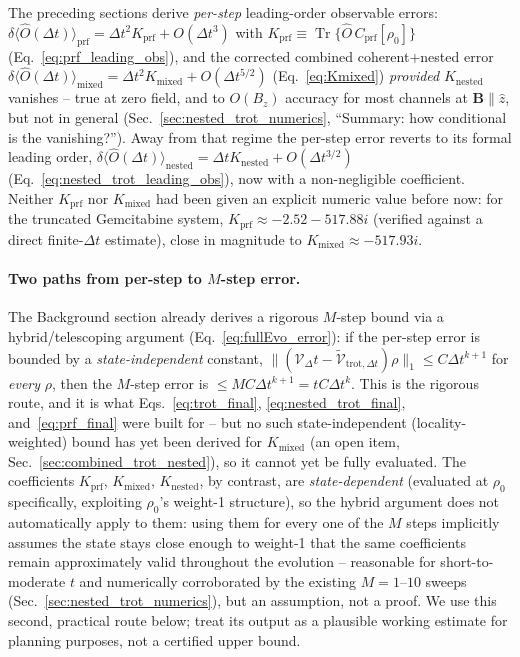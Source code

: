 \documentclass[11pt]{article}
\newcommand{\calV}{\mathcal{V}}
\newcommand{\Dt}{\Delta t}
\DeclareMathOperator{\Tr}{Tr}
\begin{document}
The preceding sections derive \emph{per-step} leading-order observable errors: $\delta\langle\hat{O}(\Dt)\rangle_{\text{prf}}=\Dt^2K_{\text{prf}}+O(\Dt^3)$ with $K_{\text{prf}}\equiv\Tr\{\hat{O}\,C_{\text{prf}}[\rho_0]\}$ (Eq.~\eqref{eq:prf_leading_obs}), and the corrected combined coherent+nested error $\delta\langle\hat{O}(\Dt)\rangle_{\text{mixed}}=\Dt^2K_{\text{mixed}}+O(\Dt^{5/2})$ (Eq.~\eqref{eq:Kmixed}) \emph{provided} $K_{\text{nested}}$ vanishes -- true at zero field, and to $O(B_z)$ accuracy for most channels at $\mathbf{B}\parallel\hat{z}$, but not in general (Sec.~\ref{sec:nested_trot_numerics}, ``Summary: how conditional is the vanishing?''). Away from that regime the per-step error reverts to its formal leading order, $\delta\langle\hat{O}(\Dt)\rangle_{\text{nested}}=\Dt K_{\text{nested}}+O(\Dt^{3/2})$ (Eq.~\eqref{eq:nested_trot_leading_obs}), now with a non-negligible coefficient. Neither $K_{\text{prf}}$ nor $K_{\text{mixed}}$ had been given an explicit numeric value before now: for the truncated Gemcitabine system, $K_{\text{prf}}\approx-2.52-517.88i$ (verified against a direct finite-$\Dt$ estimate), close in magnitude to $K_{\text{mixed}}\approx-517.93i$.

\paragraph{Two paths from per-step to \texorpdfstring{$M$}{M}-step error.} The Background section already derives a rigorous $M$-step bound via a hybrid/telescoping argument (Eq.~\eqref{eq:fullEvo_error}): if the per-step error is bounded by a \emph{state-independent} constant, $\|(\calV_\Dt-\tilde{\calV}_{\text{trot},\Dt})\rho\|_1\le C\Dt^{k+1}$ for \emph{every} $\rho$, then the $M$-step error is $\le MC\Dt^{k+1}=tC\Dt^k$. This is the rigorous route, and it is what Eqs.~\eqref{eq:trot_final}, \eqref{eq:nested_trot_final}, and~\eqref{eq:prf_final} were built for -- but no such state-independent (locality-weighted) bound has yet been derived for $K_{\text{mixed}}$ (an open item, Sec.~\ref{sec:combined_trot_nested}), so it cannot yet be fully evaluated. The coefficients $K_{\text{prf}}$, $K_{\text{mixed}}$, $K_{\text{nested}}$, by contrast, are \emph{state-dependent} (evaluated at $\rho_0$ specifically, exploiting $\rho_0$'s weight-1 structure), so the hybrid argument does not automatically apply to them: using them for every one of the $M$ steps implicitly assumes the state stays close enough to weight-1 that the same coefficients remain approximately valid throughout the evolution -- reasonable for short-to-moderate $t$ and numerically corroborated by the existing $M=1$--$10$ sweeps (Sec.~\ref{sec:nested_trot_numerics}), but an assumption, not a proof. We use this second, practical route below; treat its output as a plausible working estimate for planning purposes, not a certified upper bound.
\end{document}
